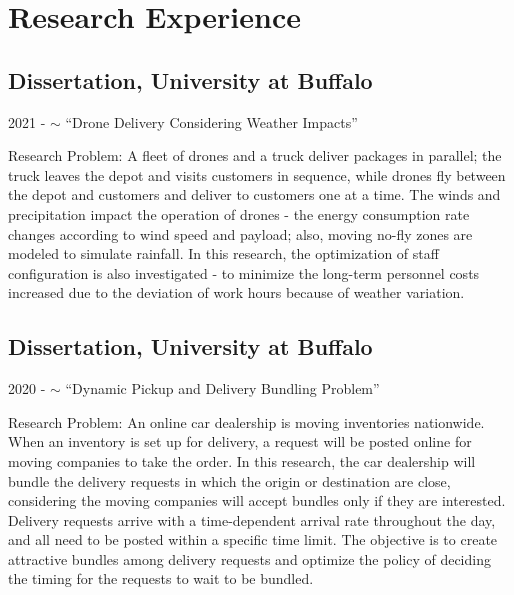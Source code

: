 \documentclass[12pt,letterpaper]{report}
\begin{document}
    \section*{Research Experience}
    \subsection*{Dissertation, University at Buffalo}
    \begin{tablist}
        \item[2021 - $\sim$] \tab{} ``Drone Delivery Considering Weather Impacts''
        \item \tab{} Research Problem: A fleet of drones and a truck deliver packages in parallel; the truck leaves the depot and visits customers in sequence, while drones fly between the depot and customers and deliver to customers one at a time. The winds and precipitation impact the operation of drones - the energy consumption rate changes according to wind speed and payload; also, moving no-fly zones are modeled to simulate rainfall. In this research, the optimization of staff configuration is also investigated - to minimize the long-term personnel costs increased due to the deviation of work hours because of weather variation.
    \end{tablist}
    \subsection*{Dissertation, University at Buffalo}
    \begin{tablist}
        \item[2020 - $\sim$] \tab{} ``Dynamic Pickup and Delivery Bundling Problem''
        \item \tab{} Research Problem: An online car dealership is moving inventories nationwide. When an inventory is set up for delivery, a request will be posted online for moving companies to take the order. In this research, the car dealership will bundle the delivery requests in which the origin or destination are close, considering the moving companies will accept bundles only if they are interested. Delivery requests arrive with a time-dependent arrival rate throughout the day, and all need to be posted within a specific time limit. The objective is to create attractive bundles among delivery requests and optimize the policy of deciding the timing for the requests to wait to be bundled.
    \end{tablist}
\end{document}
